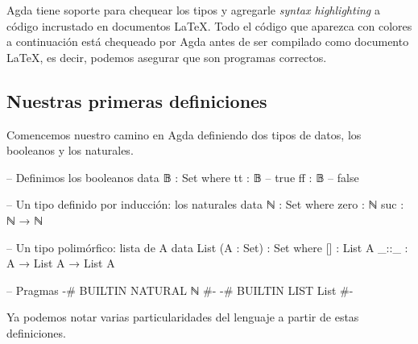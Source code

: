 \documentclass[11pt]{article} %
\begin{document}
Agda tiene soporte para chequear los tipos y agregarle \textit{syntax highlighting} a código incrustado en documentos \LaTeX. Todo el código que aparezca con colores a continuación está chequeado por Agda antes de ser compilado como documento \LaTeX, es decir, podemos asegurar que son programas correctos.

\subsection{Nuestras primeras definiciones}
Comencemos nuestro camino en Agda definiendo dos tipos de datos, los booleanos y los naturales. 

\begin{code}
-- Definimos los booleanos
data 𝔹 : Set where
    tt : 𝔹    -- true
    ff : 𝔹    -- false
        
-- Un tipo definido por inducción: los naturales
data ℕ : Set where
    zero : ℕ
    suc : ℕ → ℕ

-- Un tipo polimórfico: lista de A
data List (A : Set) : Set where
    [] : List A
    _::_ : A → List A → List A 
    
-- Pragmas 
{-# BUILTIN NATURAL ℕ #-}
{-# BUILTIN LIST List #-}
\end{code}

Ya podemos notar varias particularidades del lenguaje a partir de estas definiciones.
\end{document}
